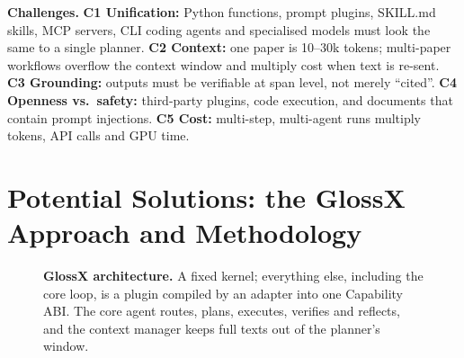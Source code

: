 \documentclass{article}
\newcommand{\sysname}{GlossX}
\begin{document}
\textbf{Challenges.}
\textbf{C1 Unification:} Python functions, prompt plugins, SKILL.md skills, MCP servers, CLI coding agents and specialised models must look the same to a single planner.
\textbf{C2 Context:} one paper is 10--30k tokens; multi-paper workflows overflow the context window and multiply cost when text is re-sent.
\textbf{C3 Grounding:} outputs must be verifiable at span level, not merely ``cited''.
\textbf{C4 Openness vs.\ safety:} third-party plugins, code execution, and documents that contain prompt injections.
\textbf{C5 Cost:} multi-step, multi-agent runs multiply tokens, API calls and GPU time.

\section{Potential Solutions: the \sysname{} Approach and Methodology}
\label{sec:design}

\begin{figure}[t]
  \centering
  \resizebox{\textwidth}{!}{}
  \caption{\textbf{\sysname{} architecture.} A fixed kernel; everything else, including the core loop, is a plugin compiled by an adapter into one Capability ABI. The core agent routes, plans, executes, verifies and reflects, and the context manager keeps full texts out of the planner's window.}
  \label{fig:arch}
  \vspace{-6pt}
\end{figure}
\end{document}
